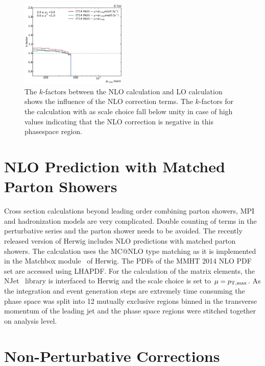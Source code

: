 \begin{figure}[htp]
    \includegraphics[width=0.45\textwidth]{figures/theory/kfactor_comp_yb2ys0.pdf}
    \caption[NLO $k$-factors of fastNLO calculation]{The $k$-factors between the NLO calculation and LO calculation
        shows the influence of the NLO correction terms. The $k$-factors for the
        calculation with \ptavg as scale choice fall below unity in case of high
        \ystar values indicating that the NLO correction is negative in this
        phasespace region.}
    \label{fig:kfactor_comp}
\end{figure}

\section{NLO Prediction with Matched Parton Showers}

Cross section calculations beyond leading order combining parton showers, MPI
and hadronization models are very complicated. Double counting of terms in the
perturbative series and the parton shower needs to be avoided. The recently
released version of Herwig includes NLO predictions with matched parton showers.
The calculation uses the MC@NLO type matching as it is implemented in the
Matchbox module~\cite{Platzer:2011bc} of Herwig. The PDFs of the MMHT 2014 NLO
PDF set are accessed using LHAPDF. For the calculation of the matrix elements,
the NJet~\cite{Badger:2012pg} library is interfaced to Herwig and the scale
choice is set to $\mu = p_{\mathrm{T,max}}$. As the integration and event generation steps
are extremely time consuming the phase space was split into 12 mutually
exclusive regions binned in the transverse momentum of the leading jet and the
phase space regions were stitched together on analysis level.


\section{Non-Perturbative Corrections}
\label{sec:np_factors}


